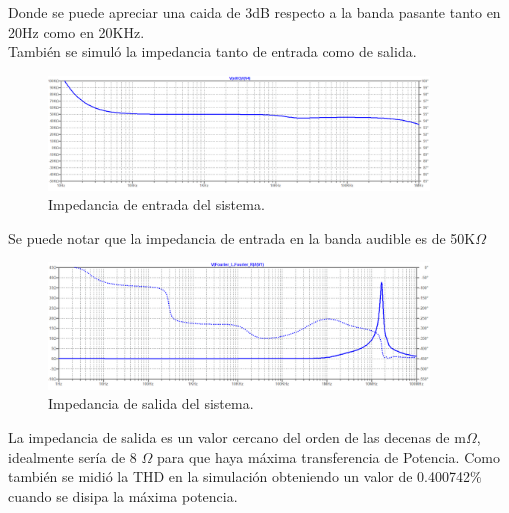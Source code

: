 Donde se puede apreciar una caida de 3dB respecto a la banda pasante tanto en 20Hz como en 20KHz.\\
También se simuló la impedancia tanto de entrada como de salida.
\begin{figure}[H]
	\centering
	\includegraphics[width=0.9\textwidth]{ImagenesSimulaciones/Zin.png}
	\caption{Impedancia de entrada del sistema.}
	\label{fig:zin}
\end{figure}
Se puede notar que la impedancia de entrada en la banda audible es de 50K$\Omega$
\begin{figure}[H]
	\centering
	\includegraphics[width=0.9\textwidth]{ImagenesSimulaciones/Zout.png}
	\caption{Impedancia de salida del sistema.}
	\label{fig:zout}
\end{figure}
La impedancia de salida es un valor cercano del orden de las decenas de  m$\Omega$, idealmente sería de 8 $\Omega$ para que haya máxima transferencia de Potencia.
Como también se midió la THD en la simulación obteniendo un valor de 0.400742$\%$ cuando se disipa la máxima potencia.
